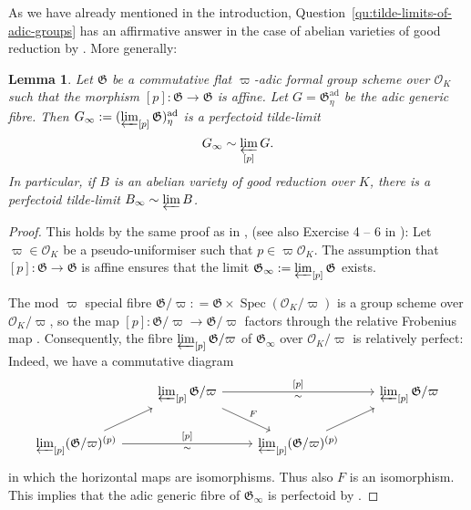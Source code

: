 \documentclass[10pt,oneside]{amsart}
\newtheorem{lemma}[theorem]{Lemma}
\theoremstyle{definition}
\newcommand{\Spec}{\operatorname{Spec}}
\newcommand{\ad}{\mathrm{ad}}
\renewcommand{\O}{\mathcal{O}}
\begin{document}
As we have already mentioned in the introduction, Question~\ref{qu:tilde-limits-of-adic-groups} has an affirmative answer in the case of abelian varieties of good reduction by \cite[Lemme~A.16]{Pilloni-Stroh}. More generally:
\begin{lemma}\label{tilde-limit exists and is perfectoid in the good reduction case}
		Let $\mathfrak G$ be a  commutative flat $\varpi$-adic formal group scheme over $\O_K$ such that the morphism $[p]:\mathfrak G\to\mathfrak G$ is affine. Let $G=\mathfrak G^{\ad}_{\eta}$ be the adic generic fibre. Then $G_\infty := (\varprojlim_{[p]}\mathfrak G)^{\ad}_\eta$ is a perfectoid tilde-limit
		\[G_\infty\sim \varprojlim_{[p]} G. \]
		In particular, if $B$ is an abelian variety of good reduction over $K$, there is a perfectoid tilde-limit $B_\infty\sim \varprojlim B$.
	\end{lemma}
\begin{proof}
	This holds by the same proof as in \cite[Lemme~A.16]{Pilloni-Stroh}, (see also Exercise 4 -- 6 in \cite{Bhatt}):
	 Let $\varpi\in\mathcal O_K$ be a pseudo-uniformiser such that $p\in \varpi\mathcal O_K$. The assumption that $[p]:\mathfrak G\to \mathfrak G$ is affine ensures that the limit $\mathfrak G_{\infty}:=\varprojlim_{[p]}\mathfrak G$ exists.
	 
	The mod $\varpi$ special fibre $\mathfrak G/\varpi: = \mathfrak G\times \Spec(\O_K/\varpi)$ is a group scheme over $\mathcal O_K/\varpi$, so the map $[p]\colon\mathfrak G/\varpi\rightarrow \mathfrak G/\varpi$ factors through the relative Frobenius map \cite[Exp. VII, 4.3]{SGA}. Consequently, the fibre $\varprojlim_{[p]}\mathfrak G/\varpi$ of $\mathfrak G_{\infty}$  over $\mathcal O_K/\varpi$ is relatively perfect: Indeed, we have a commutative diagram
	\[
\begin{tikzcd}
                                                           & {\varprojlim_{[p]}\mathfrak G/\varpi} \arrow[rd, "F"] \arrow[rr, "{[p]}","\sim"'] &                                        & {\varprojlim_{[p]}\mathfrak G/\varpi} \\
{\varprojlim_{[p]} (\mathfrak G/\varpi)^{(p)}} \arrow[ru] \arrow[rr, "{[p]}","\sim"'] &                                                          & {\varprojlim_{[p]} (\mathfrak G/\varpi)^{(p)}} \arrow[ru] &
\end{tikzcd}\]
	in which the horizontal maps are isomorphisms. Thus also $F$ is an isomorphism.
	This implies that the adic generic fibre of $\mathfrak G_{\infty}$ is perfectoid by \cite[Theorem~5.2]{perfectoid}.
\end{proof}
\end{document}
